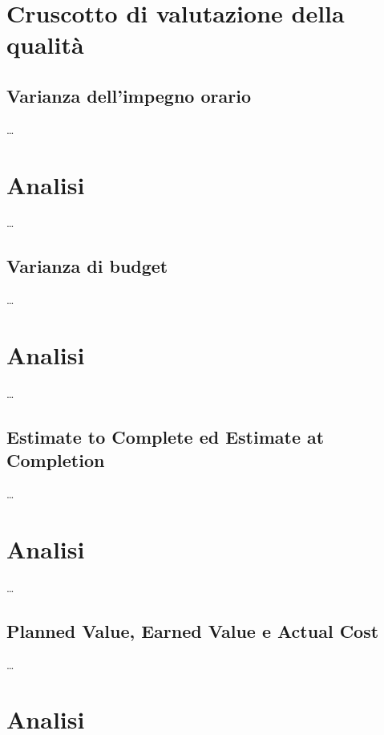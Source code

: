 

\section{Cruscotto di valutazione della qualità}
\label{sec:Cruscotto di valutazione della qualità}


\subsection{Varianza dell'impegno orario}

\dots

\section*{Analisi}

\dots



\subsection{Varianza di budget}

\dots

\section*{Analisi}

\dots



\subsection{Estimate to Complete ed Estimate at Completion}

\dots

\section*{Analisi}

\dots



\subsection{Planned Value, Earned Value e Actual Cost}

\dots

\section*{Analisi}

